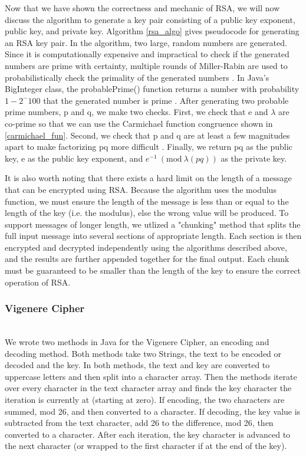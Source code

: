 \documentclass[acmlarge]{acmart}
\newcommand{\Mod}[1]{\ (\mathrm{mod}\ #1)}
\begin{document}
Now that we have shown the correctness and mechanic of RSA, we will now discuss the algorithm to generate a key pair consisting of a public key exponent, public key, and private key. Algorithm \ref{rsa_algo} gives pseudocode for generating an RSA key pair. In the algorithm, two large, random numbers are generated. Since it is computationally expensive and impractical to check if the generated numbers are prime with certainty, multiple rounds of Miller-Rabin are used to probabilistically check the primality of the generated numbers \cite{MillerRabin}. In Java's BigInteger class, the probablePrime() function returns a number with probability $1 - 2^-100$ that the generated number is prime \cite{BigIntegerDoc}. After generating two probable prime numbers, p and q, we make two checks. First, we check that e and $\lambda$ are co-prime so that we can use the Carmichael function congruence shown in \ref{carmichael_fun}. Second, we check that p and q are at least a few magnitudes apart to make factorizing pq more difficult \cite{RSA}. Finally, we return pq as the public key, e as the public key exponent, and $e^{-1} \Mod{\lambda(pq)}$ as the private key.

It is also worth noting that there exists a hard limit on the length of a message that can be encrypted using RSA. Because the algorithm uses the modulus function, we must ensure the length of the message is less than or equal to the length of the key (i.e. the modulus), else the wrong value will be produced. To support messages of longer length, we utlized a "chunking" method that splits the full input message into several sections of appropriate length. Each section is then encrypted and decrypted independently using the algorithms described above, and the results are further appended together for the final output. Each chunk must be guaranteed to be smaller than the length of the key to ensure the correct operation of RSA.

\subsubsection{Vigenere Cipher}
\hspace*{\fill} \\ %
We wrote two methods in Java for the Vigenere Cipher, an encoding and decoding method. Both methods take two Strings, the text to be encoded or decoded and the key. In both methods, the text and key are converted to uppercase letters and then split into a character array. Then the methods iterate over every character in the text character array and finds the key character the iteration is currently at (starting at zero). If encoding, the two characters are summed, mod 26, and then converted to a character. If decoding, the key value is subtracted from the text character, add 26 to the difference, mod 26, then converted to a character. After each iteration, the key character is advanced to the next character (or wrapped to the first character if at the end of the key).
\end{document}
